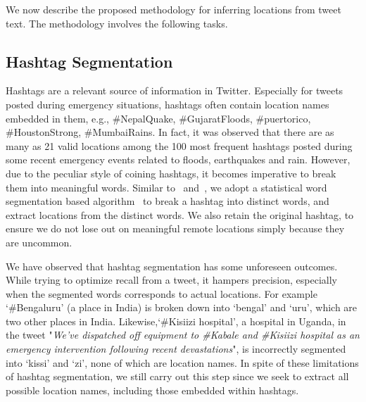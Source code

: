 We now describe the proposed methodology for inferring locations from tweet text. The methodology involves the following tasks.

\subsection{Hashtag Segmentation}

Hashtags are a relevant source of information in Twitter. Especially for tweets posted during emergency situations, hashtags often contain location names embedded in them, e.g., \#NepalQuake, \#GujaratFloods, \#puertorico, \#HoustonStrong, \#MumbaiRains. 
In fact, it was observed that there are as many as 21 valid  locations among the 100 most frequent hashtags posted during some recent emergency events related to floods, earthquakes and rain.
However, due to the peculiar style of coining hashtags, it becomes imperative to break them into meaningful words. 
Similar to~\cite{Malmasi} and~\cite{DBLP:journals/corr/abs-1708-03105}, we adopt a statistical word segmentation based algorithm~\cite{Peter} to break a hashtag into distinct words, and extract locations from the distinct words. 
We also retain the original hashtag, to ensure we do not lose out on meaningful remote locations simply because they are uncommon. 
 



We have observed that hashtag segmentation has some unforeseen outcomes. While trying to optimize recall from a tweet, it hampers precision, especially when the segmented words corresponds to actual locations. 
For example `\#Bengaluru' (a place in India) is broken down into `bengal' and `uru', which are two other places in India. 
Likewise,`\#Kisiizi hospital', a hospital in Uganda, in the tweet "\textit{We've dispatched off equipment to \#Kabale and \#Kisiizi hospital as an emergency intervention following recent devastations}", is incorrectly segmented into `kissi' and `zi', none of which are location names.
In spite of these limitations of hashtag segmentation, we still carry out this step since we seek to extract all possible location names, including those embedded within hashtags. 


